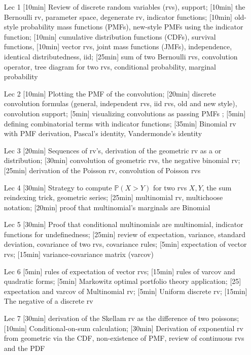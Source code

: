 \begin{enumerate}
\item[Lec 1] [10min] Review of discrete random variables (rvs), support; [10min] the Bernoulli rv, parameter space, degenerate rv, indicator functions; [10min] old-style probability mass functions (PMFs), new-style PMFs using the indicator function; [10min] cumulative distribution functions (CDFs), survival functions, [10min] vector rvs, joint mass functions (JMFs), independence, identical distributedness, iid; [25min] sum of two Bernoulli rvs, convolution operator, tree diagram for two rvs, conditional probability, marginal probability

\item[Lec 2] [10min] Plotting the PMF of the convolution; [20min] discrete convolution formulas (general, independent rvs, iid rvs, old and new style), convolution support; [5min] visualizing convolutions as passing PMFs ; [5min] defining combinatorial terms with indicator functions; [35min] Binomial rv with PMF derivation, Pascal's identity, Vandermonde's identity

\item[Lec 3] [20min] Sequences of rv's, derivation of the geometric rv as a  or  distribution; [30min] convolution of geometric rvs, the negative binomial rv; [25min] derivation of the Poisson rv, convolution of Poisson rvs

\item[Lec 4] [30min] Strategy to compute $\mathbb{P}(X > Y)$ for two rvs $X, Y$, the sum reindexing trick, geometric series; [25min] multinomial rv, multichoose notation; [20min] proof that multinomial's marginals are Binomial 

\item[Lec 5] [30min] Proof that conditional multinomials are multinomial, indicator functions for undefinedness; [25min] review of expectation, variance, standard deviation, covariance of two rvs, covariance rules; [5min] expectation of vector rvs; [15min] variance-covariance matrix (varcov)

\item[Lec 6] [5min] rules of expectation of vector rvs; [15min] rules of varcov and quadratic forms; [5min] Markowitz optimal portfolio theory application; [25] expectation and varcov of Multinomial rv; [5min] Uniform discrete rv; [15min] The negative of a discrete rv

\item[Lec 7] [30min] derivation of the Skellam rv as the difference of two poissons; [10min] Conditional-on-sum calculation; [30min] Derivation of exponential rv from geometric via the CDF, non-existence of PMF, review of continuous rvs and the PDF


\end{enumerate}
